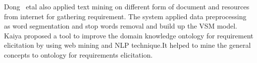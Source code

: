 	Dong ~etal \cite{dong2010} also applied text mining on
different form of document and resources from internet for gathering
requirement. The system applied data preprocessing as word segmentation and stop
words removal and build up the VSM model. Kaiya \etal \cite {Kaiya:2010} proposed a
tool to improve the domain knowledge ontology for requirement elicitation by using web mining and NLP
technique.It helped to mine the general
concepts to ontology for requirements elicitation.\\


